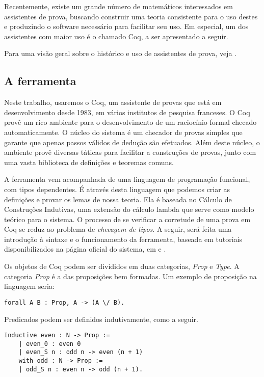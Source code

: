 Recentemente, existe um grande número de matemáticos interessados em assistentes
de prova, buscando construir uma teoria consistente para o uso destes e
produzindo o software necessário para facilitar seu uso. Em especial, um dos
assistentes com maior uso é o chamado Coq, a ser apresentado a seguir.

Para uma visão geral sobre o histórico e uso de assistentes de prova, veja
\cite{proof_assist}. 

\subsection{A ferramenta}

Neste trabalho, usaremos o Coq, um assistente de provas que está em
desenvolvimento desde 1983, em vários institutos de pesquisa franceses. O Coq
provê um rico ambiente para o desenvolvimento de um raciocínio formal checado
automaticamente. O núcleo do sistema é um checador de provas simples que garante
que apenas passos válidos de dedução são efetuados. Além deste núcleo, o
ambiente provê diversas táticas para facilitar a construções de provas, junto
com uma vasta biblioteca de definições e teoremas comuns.

A ferramenta vem acompanhada de uma linguagem de programação funcional, com
tipos dependentes. É através desta linguagem que podemos criar as definições e
provar os lemas de nossa teoria. Ela é baseada no Cálculo de Construções
Indutivas, uma extensão do cálculo lambda que serve como modelo teórico para o
sistema. O processo de se verificar a corretude de uma prova em Coq se reduz ao
problema de \emph{checagem de tipos}. A seguir, será feita uma introdução à
sintaxe e o funcionamento da ferramenta, baseada em tutoriais disponibilizados
na página oficial do sistema, em \cite{coq} e \cite{coq2}.


Os objetos de Coq podem ser divididos em duas categorias, \emph{Prop} e
\emph{Type}. A categoria \emph{Prop} é a das proposições bem formadas. Um
exemplo de proposição na linguagem seria:

\begin{lstlisting}[basicstyle=\small]
    forall A B : Prop, A -> (A \/ B).
\end{lstlisting}

Predicados podem ser definidos indutivamente, como a seguir.

\begin{lstlisting}[basicstyle=\small]
    Inductive even : N -> Prop :=
    | even_0 : even 0
    | even_S n : odd n -> even (n + 1)
    with odd : N -> Prop :=
    | odd_S n : even n -> odd (n + 1).
\end{lstlisting}

